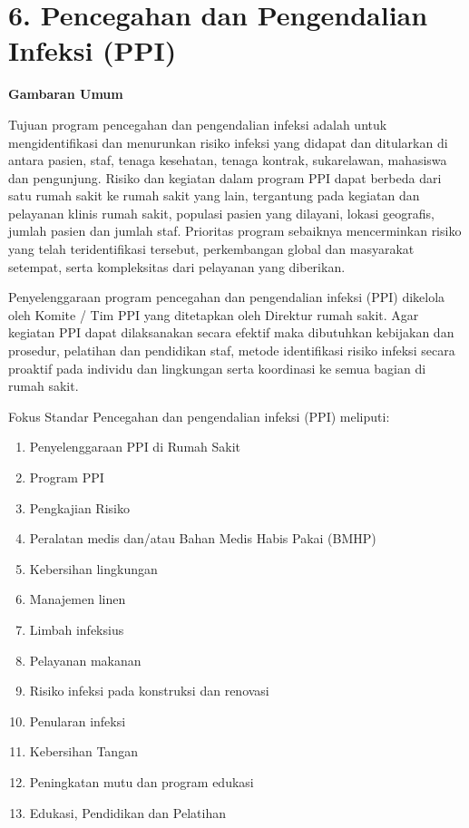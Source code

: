 \documentclass[
]{book}
\providecommand{\tightlist}{%
  \setlength{\itemsep}{0pt}\setlength{\parskip}{0pt}}
\begin{document}
\hypertarget{pencegahan-dan-pengendalian-infeksi-ppi}{%
\section*{6. Pencegahan dan Pengendalian Infeksi (PPI)}\label{pencegahan-dan-pengendalian-infeksi-ppi}}

\textbf{Gambaran Umum}

Tujuan program pencegahan dan pengendalian infeksi adalah untuk mengidentifikasi dan menurunkan risiko infeksi yang didapat dan ditularkan di antara pasien, staf, tenaga kesehatan, tenaga kontrak, sukarelawan, mahasiswa dan pengunjung. Risiko dan kegiatan dalam program PPI dapat berbeda dari satu rumah sakit ke rumah sakit yang lain, tergantung pada kegiatan dan pelayanan klinis rumah sakit, populasi pasien yang dilayani, lokasi geografis, jumlah pasien dan jumlah staf. Prioritas program sebaiknya mencerminkan risiko yang telah teridentifikasi tersebut, perkembangan global dan masyarakat setempat, serta kompleksitas dari pelayanan yang diberikan.

Penyelenggaraan program pencegahan dan pengendalian infeksi (PPI) dikelola oleh Komite / Tim PPI yang ditetapkan oleh Direktur rumah sakit. Agar kegiatan PPI dapat dilaksanakan secara efektif maka dibutuhkan kebijakan dan prosedur, pelatihan dan pendidikan staf, metode identifikasi risiko infeksi secara proaktif pada individu dan lingkungan serta koordinasi ke semua bagian di rumah sakit.

Fokus Standar Pencegahan dan pengendalian infeksi (PPI) meliputi:

\begin{enumerate}
\def\labelenumi{\alph{enumi}.}
\tightlist
\item
  Penyelenggaraan PPI di Rumah Sakit
\item
  Program PPI
\item
  Pengkajian Risiko
\item
  Peralatan medis dan/atau Bahan Medis Habis Pakai (BMHP)
\item
  Kebersihan lingkungan
\item
  Manajemen linen
\item
  Limbah infeksius
\item
  Pelayanan makanan
\item
  Risiko infeksi pada konstruksi dan renovasi
\item
  Penularan infeksi
\item
  Kebersihan Tangan
\item
  Peningkatan mutu dan program edukasi
\item
  Edukasi, Pendidikan dan Pelatihan
\end{enumerate}
\end{document}
